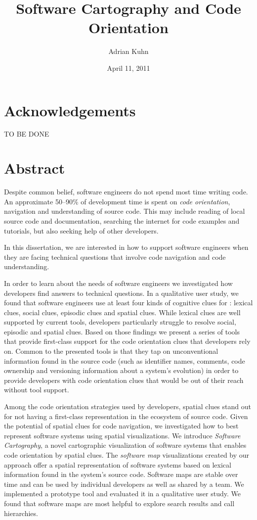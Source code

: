\documentclass[10pt,a4paper]{book}
\title{Software Cartography and Code Orientation}
\author{Adrian Kuhn}
\date{April 11, 2011}
\begin{document}


\chapter*{Acknowledgements}
TO BE DONE

\chapter*{Abstract}

Despite common belief, software engineers do not spend most time writing code. An approximate 50--90\% of development time is spent on \emph{code orientation}, \ie navigation and understanding of source code. This may include reading of local source code and documentation, searching the internet for code examples and tutorials, but also seeking help of other developers. 

In this dissertation, we are interested in how to support software engineers when they are facing technical questions that involve code navigation and code understanding. 

In order to learn about the \codenavigation needs of software engineers we investigated how developers find answers to technical questions. In a qualitative user study, we found that software engineers use at least four kinds of cognitive clues for \codenavigation: 
	lexical clues, 
	social clues, 
	episodic clues 
	and spatial clues.
While lexical clues are well supported by current tools, developers particularly struggle to resolve social, episodic and spatial clues. 
%
Based on those findings we present a series of tools that provide first-class support for the code orientation clues that developers rely on. Common to the presented tools is that they tap on unconventional information found in the source code (such as identifier names, comments, code ownership and versioning information about a system's evolution) in order to provide developers with code orientation clues that would be out of their reach without tool support.

Among the code orientation strategies used by developers, spatial clues stand out for not having a first-class representation in the ecosystem of source code. Given the potential of spatial clues for code navigation, we investigated how to best represent software systems using spatial visualizations. 
%
We introduce \emph{Software Cartography}, a novel cartographic visualization of software systems that enables code orientation by spatial clues. The \emph{software map} visualizations created by our approach offer a spatial representation of software systems based on lexical information found in the system's source code. 
Software maps are stable over time and can be used by individual developers as well as shared by a team. 
We implemented a prototype tool and evaluated it in a qualitative user study. We found that software maps are most helpful to explore search results and call hierarchies.

\setcounter{tocdepth}{1}
\tableofcontents






\end{document}
